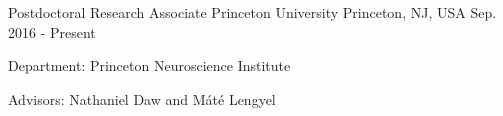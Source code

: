 \begin{cventries}
  \cventry
    {Postdoctoral Research Associate}
    {Princeton University}
    {Princeton, NJ, USA}
    {Sep. 2016 - Present}
    {
      \begin{cvitems}
        \item {Department: Princeton Neuroscience Institute}
        \item {Advisors: Nathaniel Daw and M\'at\'e Lengyel}
      \end{cvitems}
    }
\end{cventries}
